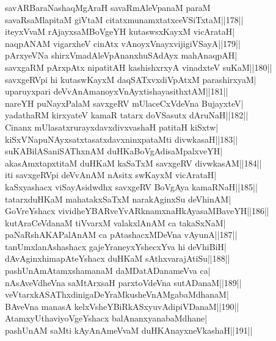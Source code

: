 \documentclass{article}
\begin{document}
savARBaraNashaqMgAraH savaRmAleVpanaM paraM\\
savaRsaMlapitaM giVtaM citatxmunamxtatxceVSiTxtaM||178||\\
iteyxVvaM rAjayxsaMBoVgeYH kutaswsxKayxM vicArataH|\\
naqpANAM vigarxheV cinAtx vAnoyxVnayxvijigiVSayA||179||\\
pArxyeVNa shirxVmadAleVpAnanxhuSAdAyx mahAnaqpAH|\\
savxgaRM pArxpAtx nipatitAH kashishxrxyA vinadxteV suKaM||180||\\
savxgeRVpi hi kutaswKayxM daqSATxvxdiVpAtxM parashirxyaM|\\
uparuyxpari deVvAnAmanoyxVnAyxtishayasithxtAM||181||\\
nareYH puNayxPalaM savxgeRV mUlaceCxVdeVna BujayxteV|\\
yadathaRM kirxyateV kamaR tatarx doVSasutx dAruNaH||182||\\
Cinanx mUlasatxrurayxdavxdivxvashaH patitaH kiSxtw|\\
kiSxVNapuNAyxsatxtasatxdavxninxpataMti divwkasaH||183||\\
suKABilASaniSAThxnAM duHKaBoVgAdisaMpalxveYH|\\
akasAmxtapxtitaM duHKaM kaSaTxM savxgeRV divwkasAM||184||\\
iti savxgeRVpi deVvAnAM nAsitx swKayxM vicArataH|\\
kaSxyashacx viSayAsidwdhx savxgeRV BoVgAya kamaRNaH||185||\\
tatarxduHKaM mahatakxSaTxM narakAginxSu deVhinAM|\\
GoVreYshacx vividheYBARveYvARknamxnaHkAyasaMBaveYH||186||\\
kutAraCeVdanaM tiVvarxM valakxlAnAM ca takaSxNaM|\\
paNaRshAKAPalAnAM ca pAtashacxMDeVna vAyunA||187||\\
tanUmxlanAshashacx gajeYraneyxYshecxYva hi deVhiBiH|\\
dAvAginxhimapAteYshacx duHKaM sAthxvarajAtiSu||188||\\
pashUnAmAtamxshamanaM daMDatADanameVva ca|\\
nAsAveVdheVna saMtArxsaH parxtoVdeVna sutADanaM||189||\\
veVtarxkASAThxdinigaDeYraMkusheVnAMgabaMdhanaM|\\
BAveVna manasA kelxVsheYBiRkASxyuvAdipiVDanaM||190||\\
AtamxyUthaviyoVgeYshacx balAnanxyanabaMdhane|\\
pashUnAM saMti kAyAnAmeVvaM duHKAnayxneVkashaH||191||\\
\end{document}
